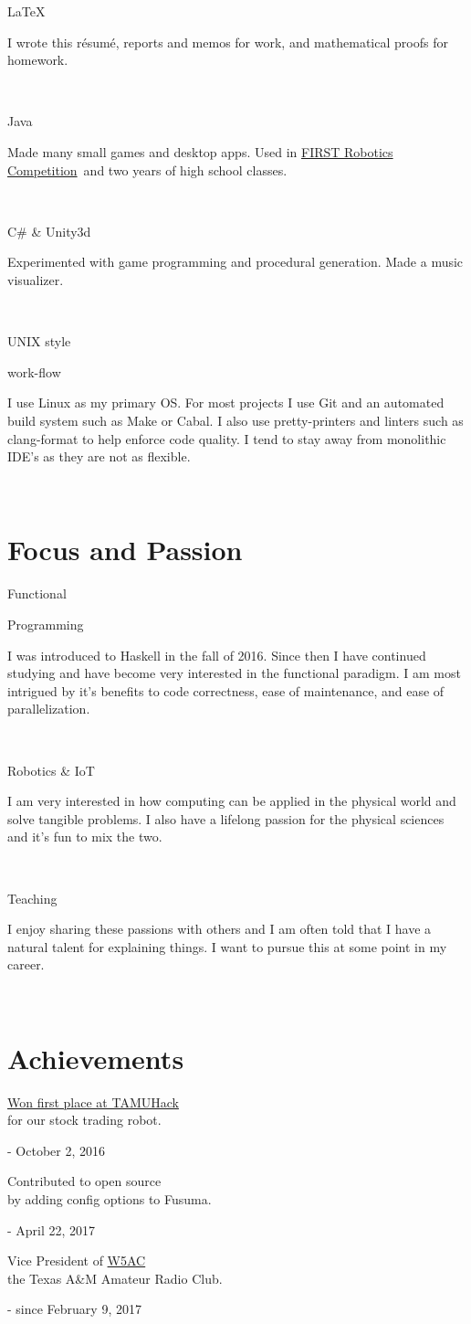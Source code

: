 \documentclass{article}
\newcommand{\jskill}[2]{

\begin{minipage}[t]{.15\textwidth}
\hfill #1
\end{minipage}
\hspace{.05em}\vline\hspace{.05em}
\begin{minipage}[t]{.80\textwidth}
#2
\end{minipage}\\\vspace{.1em}}
\newcommand{\frc}{\href{https://www.firstinspires.org/robotics/frc}{FIRST Robotics Competition}}
\begin{document}
\jskill{\LaTeX}{I wrote this r\'esum\'e, reports and memos for work, and mathematical proofs for homework.}

\jskill{Java}{Made many small games and desktop apps. Used in \frc\ and two years of high school classes.}

\jskill{C\# \& Unity3d}{Experimented with game programming and procedural generation. Made a music visualizer.}

\jskill{UNIX style 

\hfill work-flow}{I use Linux as my primary OS. For most projects I use Git and an automated build system such as Make or Cabal. I also use pretty-printers and linters such as clang-format to help enforce code quality. I tend to stay away from monolithic IDE's as they are not as flexible.}

\section{Focus and Passion}

\jskill{Functional 

\hfill Programming} {I was introduced to Haskell in the fall of 2016. Since then I have continued studying and have become very interested in the functional paradigm. I am most intrigued by it's benefits to code correctness, ease of maintenance, and ease of parallelization.}

\jskill{Robotics \& IoT}{I am very interested in how computing can be applied in the physical world and solve tangible problems. I also have a lifelong passion for the physical sciences and it's fun to mix the two.}

\jskill{Teaching}{I enjoy sharing these passions with others and I am often told that I have a natural talent for explaining things. I want to pursue this at some point in my career.}

\section{Achievements}

\noindent
\begin{minipage}[t]{0.33\textwidth}
\href{https://devpost.com/software/midas-evi574}{Won first place at TAMUHack} \\
for our stock trading robot.

\hfill - October 2, 2016
\end{minipage}\hfill
\begin{minipage}[t]{0.33\textwidth}
Contributed to open source \\
by adding config options to Fusuma.

\hfill - April 22, 2017
\end{minipage}\hfill
\begin{minipage}[t]{0.33\textwidth}
Vice President of \href{http://w5ac.tamu.edu}{W5AC} \\
the Texas A\&M Amateur Radio Club.

\hfill - since February 9, 2017
\end{minipage}

\begin{center}
\end{center}
\end{document}
